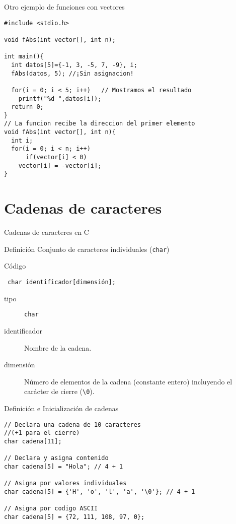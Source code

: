 \documentclass[xcolor={usenames,svgnames,dvipsnames}, aspectratio=169]{beamer}
\begin{document}
\begin{frame}[label={sec:org25ea962},fragile,plain]{Otro ejemplo de funciones con vectores}
 \lstset{language=C,label= ,caption= ,captionpos=b,numbers=none}
\begin{lstlisting}
#include <stdio.h>

void fAbs(int vector[], int n);

int main(){
  int datos[5]={-1, 3, -5, 7, -9}, i;
  fAbs(datos, 5); //¡Sin asignacion!

  for(i = 0; i < 5; i++)   // Mostramos el resultado
    printf("%d ",datos[i]);
  return 0;
}
// La funcion recibe la direccion del primer elemento
void fAbs(int vector[], int n){
  int i;
  for(i = 0; i < n; i++)
      if(vector[i] < 0)
	vector[i] = -vector[i];
}
\end{lstlisting}
\end{frame}

\section{Cadenas de caracteres}
\label{sec:org7491091}
\begin{frame}[label={sec:org21245b6},fragile]{Cadenas de caracteres en C}
 \begin{block}{Definición}
Conjunto de caracteres individuales (\texttt{char})
\end{block}
\begin{block}{Código}
\lstset{language=C,label= ,caption= ,captionpos=b,numbers=none}
\begin{lstlisting}
 char identificador[dimensión];
\end{lstlisting}

\begin{description}
\item[{tipo}] \texttt{char}
\item[{identificador}] Nombre de la cadena.
\item[{dimensión}] Número de elementos de la cadena (constante entero) \alert{incluyendo el carácter de cierre} (\texttt{\textbackslash{}0}).
\end{description}
\end{block}
\end{frame}

\begin{frame}[label={sec:org6d4d3c2},fragile]{Definición e Inicialización de cadenas}
 \lstset{language=C,label= ,caption= ,captionpos=b,numbers=none}
\begin{lstlisting}
// Declara una cadena de 10 caracteres 
//(+1 para el cierre)
char cadena[11];

// Declara y asigna contenido
char cadena[5] = "Hola"; // 4 + 1

// Asigna por valores individuales
char cadena[5] = {'H', 'o', 'l', 'a', '\0'}; // 4 + 1

// Asigna por codigo ASCII
char cadena[5] = {72, 111, 108, 97, 0}; 

\end{lstlisting}
\end{frame}
\end{document}
